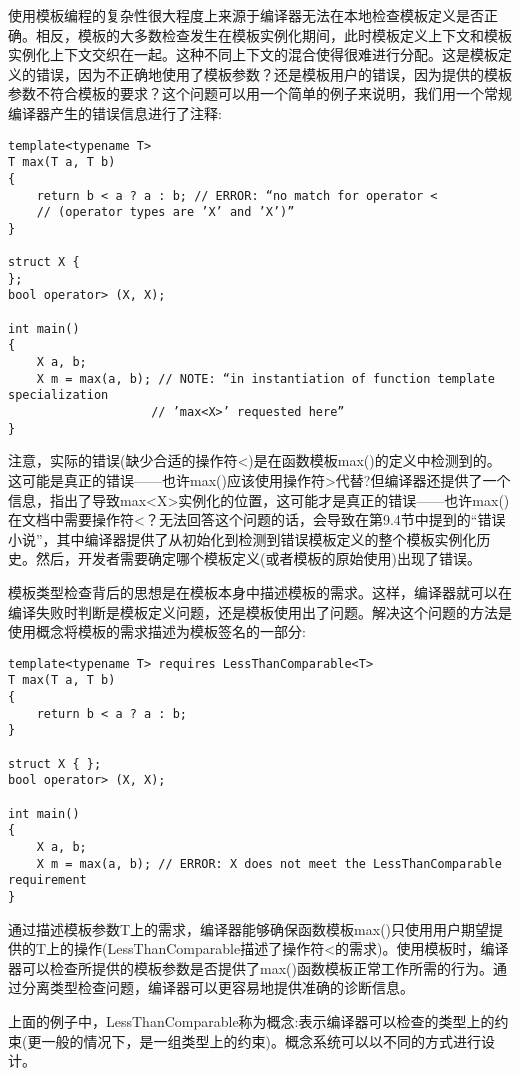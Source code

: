 
使用模板编程的复杂性很大程度上来源于编译器无法在本地检查模板定义是否正确。相反，模板的大多数检查发生在模板实例化期间，此时模板定义上下文和模板实例化上下文交织在一起。这种不同上下文的混合使得很难进行分配。这是模板定义的错误，因为不正确地使用了模板参数？还是模板用户的错误，因为提供的模板参数不符合模板的要求？这个问题可以用一个简单的例子来说明，我们用一个常规编译器产生的错误信息进行了注释:

\begin{lstlisting}[style=styleCXX]
template<typename T>
T max(T a, T b)
{
	return b < a ? a : b; // ERROR: “no match for operator <
	// (operator types are ’X’ and ’X’)”
}

struct X {
};
bool operator> (X, X);

int main()
{
	X a, b;
	X m = max(a, b); // NOTE: “in instantiation of function template specialization
					// ’max<X>’ requested here”
}
\end{lstlisting}

注意，实际的错误(缺少合适的操作符<)是在函数模板max()的定义中检测到的。这可能是真正的错误——也许max()应该使用操作符>代替?但编译器还提供了一个信息，指出了导致max<X>实例化的位置，这可能才是真正的错误——也许max()在文档中需要操作符<？无法回答这个问题的话，会导致在第9.4节中提到的“错误小说”，其中编译器提供了从初始化到检测到错误模板定义的整个模板实例化历史。然后，开发者需要确定哪个模板定义(或者模板的原始使用)出现了错误。

模板类型检查背后的思想是在模板本身中描述模板的需求。这样，编译器就可以在编译失败时判断是模板定义问题，还是模板使用出了问题。解决这个问题的方法是使用概念将模板的需求描述为模板签名的一部分:

\begin{lstlisting}[style=styleCXX]
template<typename T> requires LessThanComparable<T>
T max(T a, T b)
{
	return b < a ? a : b;
}

struct X { };
bool operator> (X, X);

int main()
{
	X a, b;
	X m = max(a, b); // ERROR: X does not meet the LessThanComparable requirement
}
\end{lstlisting}

通过描述模板参数T上的需求，编译器能够确保函数模板max()只使用用户期望提供的T上的操作(LessThanComparable描述了操作符<的需求)。使用模板时，编译器可以检查所提供的模板参数是否提供了max()函数模板正常工作所需的行为。通过分离类型检查问题，编译器可以更容易地提供准确的诊断信息。

上面的例子中，LessThanComparable称为概念:表示编译器可以检查的类型上的约束(更一般的情况下，是一组类型上的约束)。概念系统可以以不同的方式进行设计。

